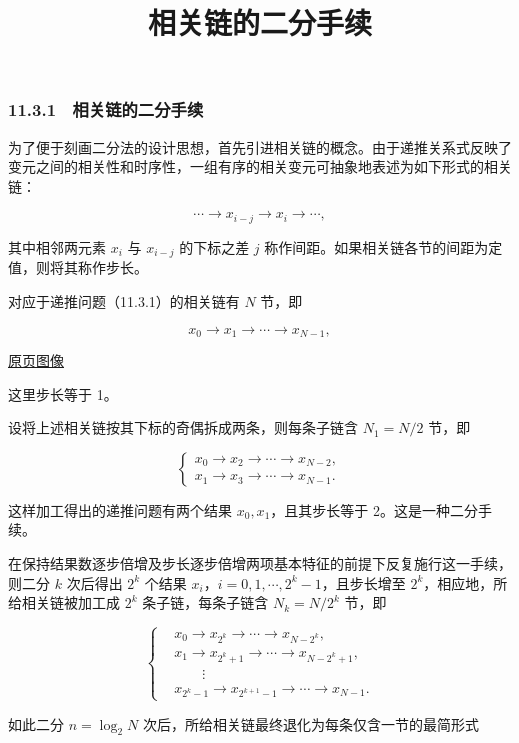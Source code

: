 \documentclass[
  10pt,
  fontset=fandol]{ctexart}
\title{相关链的二分手续}
\author{}
\date{}
\begin{document}
\maketitle

\subsubsection{11.3.1　相关链的二分手续}\label{ux76f8ux5173ux94feux7684ux4e8cux5206ux624bux7eed}

为了便于刻画二分法的设计思想，首先引进相关链的概念。由于递推关系式反映了变元之间的相关性和时序性，一组有序的相关变元可抽象地表述为如下形式的相关链：

\[
\cdots\to x_{i-j}\to x_i\to\cdots,
\]

其中相邻两元素 \(x_i\) 与 \(x_{i-j}\) 的下标之差 \(j\) 称作间距。如果相关链各节的间距为定值，则将其称作步长。

对应于递推问题（11.3.1）的相关链有 \(N\) 节，即

\[
x_0\to x_1\to\cdots\to x_{N-1},
\]

\href{../../source-images/pdf-286.jpeg}{原页图像}

这里步长等于 1。

设将上述相关链按其下标的奇偶拆成两条，则每条子链含 \(N_1=N/2\) 节，即

\[
\begin{cases}
x_0\to x_2\to\cdots\to x_{N-2},\\
x_1\to x_3\to\cdots\to x_{N-1}.
\end{cases}
\tag{11.3.2}
\]

这样加工得出的递推问题有两个结果 \(x_0,x_1\)，且其步长等于 2。这是一种二分手续。

在保持结果数逐步倍增及步长逐步倍增两项基本特征的前提下反复施行这一手续，则二分 \(k\) 次后得出 \(2^k\) 个结果 \(x_i\)，\(i=0,1,\cdots,2^k-1\)，且步长增至 \(2^k\)，相应地，所给相关链被加工成 \(2^k\) 条子链，每条子链含 \(N_k=N/2^k\) 节，即

\[
\left\{
\begin{aligned}
&x_0\to x_{2^k}\to\cdots\to x_{N-2^k},\\
&x_1\to x_{2^k+1}\to\cdots\to x_{N-2^k+1},\\
&\qquad\vdots\\
&x_{2^k-1}\to x_{2^{k+1}-1}\to\cdots\to x_{N-1}.
\end{aligned}
\right.
\tag{11.3.3}
\]

如此二分 \(n=\log_2 N\) 次后，所给相关链最终退化为每条仅含一节的最简形式
\end{document}
